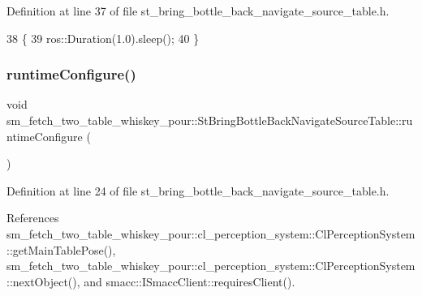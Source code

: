Definition at line 37 of file st\+\_\+bring\+\_\+bottle\+\_\+back\+\_\+navigate\+\_\+source\+\_\+table.\+h.


\begin{DoxyCode}
38         \{
39             ros::Duration(1.0).sleep();
40         \}
\end{DoxyCode}
\mbox{\label{structsm__fetch__two__table__whiskey__pour_1_1StBringBottleBackNavigateSourceTable_a7f19e9282a3d89c41a41e0a8e66177dc}} 
\subsubsection{\texorpdfstring{runtime\+Configure()}{runtimeConfigure()}}
{\footnotesize\ttfamily void sm\+\_\+fetch\+\_\+two\+\_\+table\+\_\+whiskey\+\_\+pour\+::\+St\+Bring\+Bottle\+Back\+Navigate\+Source\+Table\+::runtime\+Configure (\begin{DoxyParamCaption}{ }\end{DoxyParamCaption})\hspace{0.3cm}{\ttfamily [inline]}}



Definition at line 24 of file st\+\_\+bring\+\_\+bottle\+\_\+back\+\_\+navigate\+\_\+source\+\_\+table.\+h.



References sm\+\_\+fetch\+\_\+two\+\_\+table\+\_\+whiskey\+\_\+pour\+::cl\+\_\+perception\+\_\+system\+::\+Cl\+Perception\+System\+::get\+Main\+Table\+Pose(), sm\+\_\+fetch\+\_\+two\+\_\+table\+\_\+whiskey\+\_\+pour\+::cl\+\_\+perception\+\_\+system\+::\+Cl\+Perception\+System\+::next\+Object(), and smacc\+::\+I\+Smacc\+Client\+::requires\+Client().


